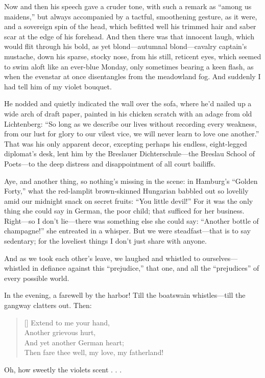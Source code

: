 \documentclass[12pt,a4paper]{article}
\begin{document}
Now and then his speech gave a cruder tone, with such a remark as “among us maidens,” but always accompanied by a tactful, smoothening gesture, as it were, and a sovereign spin of the head, which befitted well his trimmed hair and saber scar at the edge of his forehead. And then there was that innocent laugh, which would flit through his bold, as yet blond—autumnal blond—cavalry captain’s mustache, down his sparse, stocky nose, from his still, reticent eyes, which seemed to swim aloft like an ever-blue Monday, only sometimes bearing a keen flash, as when the evenstar at once disentangles from the meadowland fog. And suddenly I had tell him of my violet bouquet.

He nodded and quietly indicated the wall over the sofa, where he’d nailed up a wide arch of draft paper, painted in his chicken scratch with an adage from old Lichtenberg: “So long as we describe our lives without recording every weakness, from our lust for glory to our vilest vice, we will never learn to love one another.” That was his only apparent decor, excepting perhaps his endless, eight-legged diplomat’s desk, lent him by the Breslauer Dichterschule—the Breslau School of Poets—to the deep distress and disappointment of all court bailiffs.

Aye, and another thing, so nothing’s missing in the scene: in Hamburg’s “Golden Forty,” what the red-lamplit brown-skinned Hungarian babbled out so lovelily amid our midnight snack on secret fruits: “You little devil!” For it was the only thing she could say in German, the poor child; that sufficed for her business. Right—so I don’t lie—there was something else she could say: “Another bottle of champagne!” she entreated in a whisper. But we were steadfast—that is to say sedentary; for the loveliest things I don’t just share with anyone.

And as we took each other’s leave, we laughed and whistled to ourselves—whistled in defiance against this “prejudice,” that one, and all the “prejudices” of every possible world.

In the evening, a farewell by the harbor! Till the boatswain whistles—till the gangway clatters out. Then:
\settowidth{\versewidth}{Then fare thee well, my love, my fatherland!}
\begin{verse}[\versewidth]
Extend to me your hand, \\
Another grievous hurt, \\
And yet another German heart; \\
Then fare thee well, my love, my fatherland!
\end{verse}
Oh, how sweetly the violets scent . . .
\end{document}
